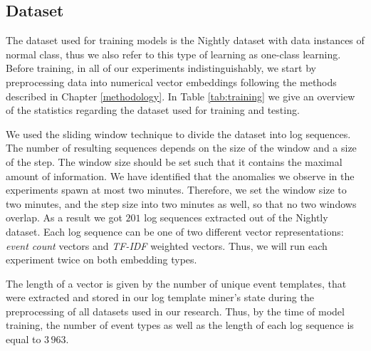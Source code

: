 \subsection{Dataset}
The dataset used for training models is the Nightly dataset with data instances of normal class, thus we also refer to this type of learning as one-class learning. Before training, in all of our experiments indistinguishably, we start by preprocessing data into numerical vector embeddings following the methods described in Chapter \ref{methodology}. In Table \ref{tab:training} we give an overview of the statistics regarding the dataset used for training and testing.

We used the sliding window technique to divide the dataset into log sequences. The number of resulting sequences depends on the size of the window and a size of the step.  The window size should be set such that it contains the maximal amount of information. We have identified that the anomalies we observe in the experiments spawn at most two minutes. Therefore, we set the window size to two minutes, and the step size into two minutes as well, so that no two windows overlap. As a result we got $201$ log sequences extracted out of the Nightly dataset. Each log sequence can be one of two different vector representations: \textit{event count} vectors and \textit{TF-IDF} weighted vectors. Thus, we will run each experiment twice on both embedding types.

The length of a vector is given by the number of unique event templates, that were extracted and stored in our log template miner's state during the preprocessing of all datasets used in our research. Thus, by the time of model training, the number of event types as well as the length of each log sequence is equal to $3\,963$.

\begin{table}[h]
\centering
{}
    \caption{Summary of statistics of the Nightly dataset used for training and Testing dataset used for model evaluation and hyperparameter tuning.}
    \label{tab:training}
\end{table}


